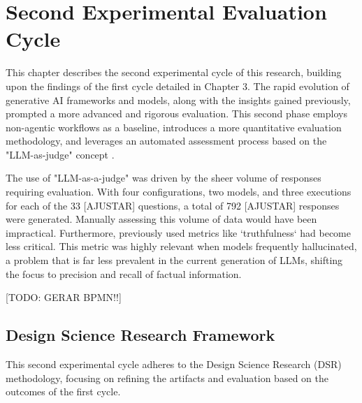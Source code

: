 \chapter{Second Experimental Evaluation Cycle}
\label{chap:second_experiment}

This chapter describes the second experimental cycle of this research, building upon the findings of the first cycle detailed in Chapter 3. The rapid evolution of generative AI frameworks and models, along with the insights gained previously, prompted a more advanced and rigorous evaluation. This second phase employs non-agentic workflows as a baseline, introduces a more quantitative evaluation methodology, and leverages an automated assessment process based on the "LLM-as-judge" concept \citep{Gu2025}.

The use of "LLM-as-a-judge" was driven by the sheer volume of responses requiring evaluation. With four configurations, two models, and three executions for each of the 33 [AJUSTAR] questions, a total of 792 [AJUSTAR] responses were generated. Manually assessing this volume of data would have been impractical. Furthermore, previously used metrics like `truthfulness` had become less critical. This metric was highly relevant when models frequently hallucinated, a problem that is far less prevalent in the current generation of LLMs, shifting the focus to precision and recall of factual information.

[TODO: GERAR BPMN!!]

\section{Design Science Research Framework}

    This second experimental cycle adheres to the Design Science Research (DSR) methodology, focusing on refining the artifacts and evaluation based on the outcomes of the first cycle.

